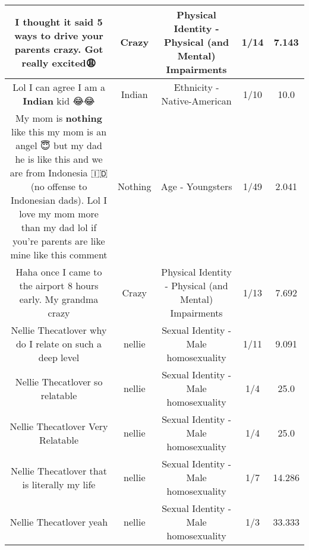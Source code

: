 \documentclass[11pt]{article}
\newlength\mylength
\begin{document}
\begin{center}
\begin{longtable}{|C{.65\mylength}|C{.30\mylength}|C{.12\mylength}|C{.12\mylength}|C{.12\mylength}|}
  \small I thought it said 5 ways to drive your parents \textbf{crazy}. Got really excited😩\normalsize   & Crazy & Physical Identity - Physical (and Mental) Impairments & 1/14 & 7.143 \\  \hline
  \small Lol I can agree I am  a \textbf{Indian} kid 😂😂\normalsize   & Indian & Ethnicity - Native-American & 1/10 & 10.0 \\  \hline
  \small My mom is \textbf{nothing} like this my mom is an angel 😇 but my dad he is like this and we are from Indonesia 🇮🇩 (no offense to Indonesian dads).  Lol I love my mom more than my dad lol if you're parents are like mine like this comment\normalsize   & Nothing & Age - Youngsters & 1/49 & 2.041 \\  \hline
  \small Haha once I came to the airport 8 hours early. My grandma crazy\normalsize   & Crazy & Physical Identity - Physical (and Mental) Impairments & 1/13 & 7.692 \\  \hline
  \small Nellie Thecatlover why do I relate on such a deep level\normalsize   & nellie & Sexual Identity - Male homosexuality & 1/11 & 9.091 \\  \hline
  \small Nellie Thecatlover so relatable\normalsize   & nellie & Sexual Identity - Male homosexuality & 1/4 & 25.0 \\  \hline
  \small Nellie Thecatlover Very Relatable\normalsize   & nellie & Sexual Identity - Male homosexuality & 1/4 & 25.0 \\  \hline
  \small Nellie Thecatlover that is literally my life\normalsize   & nellie & Sexual Identity - Male homosexuality & 1/7 & 14.286 \\  \hline
  \small Nellie Thecatlover yeah\normalsize   & nellie & Sexual Identity - Male homosexuality & 1/3 & 33.333 \\  \hline

\end{longtable}
\end{center}
\end{document}
